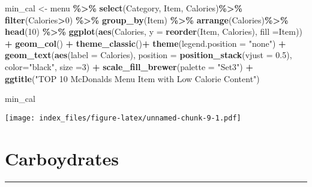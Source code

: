 \documentclass[
]{article}
\newenvironment{Shaded}{\begin{snugshade}}{\end{snugshade}}
\newcommand{\AttributeTok}[1]{\textcolor[rgb]{0.13,0.29,0.53}{#1}}
\newcommand{\DecValTok}[1]{\textcolor[rgb]{0.00,0.00,0.81}{#1}}
\newcommand{\FloatTok}[1]{\textcolor[rgb]{0.00,0.00,0.81}{#1}}
\newcommand{\FunctionTok}[1]{\textcolor[rgb]{0.13,0.29,0.53}{\textbf{#1}}}
\newcommand{\NormalTok}[1]{#1}
\newcommand{\OtherTok}[1]{\textcolor[rgb]{0.56,0.35,0.01}{#1}}
\newcommand{\SpecialCharTok}[1]{\textcolor[rgb]{0.81,0.36,0.00}{\textbf{#1}}}
\newcommand{\StringTok}[1]{\textcolor[rgb]{0.31,0.60,0.02}{#1}}
\begin{document}
\begin{Shaded}
\begin{Highlighting}[]
\NormalTok{min\_cal }\OtherTok{\textless{}{-}}\NormalTok{ menu }\SpecialCharTok{\%\textgreater{}\%}
  \FunctionTok{select}\NormalTok{(Category,}
\NormalTok{         Item,}
\NormalTok{         Calories)}\SpecialCharTok{\%\textgreater{}\%} 
  \FunctionTok{filter}\NormalTok{(Calories}\SpecialCharTok{\textgreater{}}\DecValTok{0}\NormalTok{) }\SpecialCharTok{\%\textgreater{}\%} 
  \FunctionTok{group\_by}\NormalTok{(Item) }\SpecialCharTok{\%\textgreater{}\%} 
  \FunctionTok{arrange}\NormalTok{(Calories)}\SpecialCharTok{\%\textgreater{}\%} 
  \FunctionTok{head}\NormalTok{(}\DecValTok{10}\NormalTok{) }\SpecialCharTok{\%\textgreater{}\%} 
  \FunctionTok{ggplot}\NormalTok{(}\FunctionTok{aes}\NormalTok{(Calories,}
             \AttributeTok{y =} \FunctionTok{reorder}\NormalTok{(Item,}
\NormalTok{                         Calories),}
             \AttributeTok{fill =}\NormalTok{Item)) }\SpecialCharTok{+} 
  \FunctionTok{geom\_col}\NormalTok{() }\SpecialCharTok{+} 
  \FunctionTok{theme\_classic}\NormalTok{()}\SpecialCharTok{+} 
  \FunctionTok{theme}\NormalTok{(}\AttributeTok{legend.position =} \StringTok{"none"}\NormalTok{) }\SpecialCharTok{+} 
  \FunctionTok{geom\_text}\NormalTok{(}\FunctionTok{aes}\NormalTok{(}\AttributeTok{label =}\NormalTok{ Calories), }
            \AttributeTok{position =} \FunctionTok{position\_stack}\NormalTok{(}\AttributeTok{vjust =} \FloatTok{0.5}\NormalTok{),}
            \AttributeTok{color=}\StringTok{"black"}\NormalTok{, }\AttributeTok{size =}\DecValTok{3}\NormalTok{) }\SpecialCharTok{+}
  \FunctionTok{scale\_fill\_brewer}\NormalTok{(}\AttributeTok{palette =} \StringTok{"Set3"}\NormalTok{) }\SpecialCharTok{+} \FunctionTok{ggtitle}\NormalTok{(}\StringTok{"TOP 10 McDonald\textquotesingle{}s Menu Item with Low Calorie Content"}\NormalTok{)}

\NormalTok{min\_cal}
\end{Highlighting}
\end{Shaded}

\texttt{[image: index\_files/figure-latex/unnamed-chunk-9-1.pdf]}

\hypertarget{carboydrates}{%
\section{Carboydrates}\label{carboydrates}}

\begin{center}\rule{0.5\linewidth}{0.5pt}\end{center}
\end{document}
